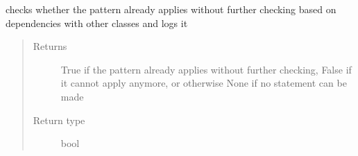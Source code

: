 \documentclass[letterpaper,10pt,english]{sphinxmanual}
\begin{document}
\begin{fulllineitems}
\begin{fulllineitems}
\label{\detokenize{event_log_analyzer:event_log_analyzer.pattern_library.pattern.Pattern.check_dependencies}}
\sphinxAtStartPar
checks whether the pattern already applies without further checking based on dependencies with other classes and logs it
\begin{quote}\begin{description}
\item[{Returns}] \leavevmode
\sphinxAtStartPar
True if the pattern already applies without further checking, False if it cannot apply anymore, or otherwise None if no statement can be made

\item[{Return type}] \leavevmode
\sphinxAtStartPar
bool

\end{description}\end{quote}

\end{fulllineitems}


\begin{fulllineitems}
\label{\detokenize{event_log_analyzer:id0}}
\end{fulllineitems}


\begin{fulllineitems}
\label{\detokenize{event_log_analyzer:id1}}
\end{fulllineitems}



\end{fulllineitems}
\end{document}
